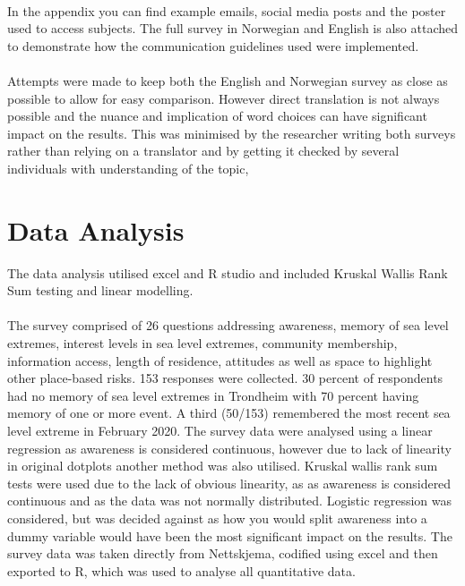 \paragraph{}
In the appendix you can find example emails, social media posts and the poster used to access subjects. The full survey in Norwegian and English is also attached to demonstrate how the communication guidelines used were implemented.
\paragraph{}

Attempts were made to keep both the English and Norwegian survey as close as possible to allow for easy comparison. However direct translation is not always possible and the nuance and implication of word choices can have significant impact on the results. This was minimised by the researcher writing both surveys rather than relying on a translator and by getting it checked by several individuals with understanding of the topic,



\section{Data Analysis}
 The data analysis utilised excel and R studio and included Kruskal Wallis Rank Sum testing and linear modelling. 
\paragraph{}
  The survey comprised of 26 questions addressing awareness, memory of sea level extremes, interest levels in sea level extremes, community membership, information access, length of residence, attitudes as well as space to highlight other place-based risks. 153 responses were collected. 30 percent of respondents had no memory of sea level extremes in Trondheim with 70 percent having memory of one or more event. A third (50/153) remembered the most recent sea level extreme in February 2020. The survey data were analysed using a linear regression as awareness is considered continuous, however due to lack of linearity in original dotplots another method was also utilised. Kruskal wallis rank sum tests were used due to the lack of obvious linearity, as as awareness is considered continuous and as the data was not normally distributed. Logistic regression was considered, but was decided against as how you would split awareness into a dummy variable would have been the most significant impact on the results. The survey data was taken directly from Nettskjema, codified using excel and then exported to R, which was used to analyse all quantitative data. 
